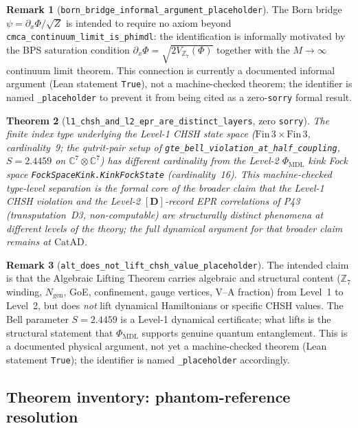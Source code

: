 \documentclass[11pt,a4paper]{article}
\newtheorem{theorem}{Theorem}[section]
\theoremstyle{definition}
\newtheorem{remark}[theorem]{Remark}
\newcommand{\CatAD}{\ensuremath{\mathrm{CatAD}}}
\newcommand{\ZS}{\mathbb{Z}_7}
\begin{document}
\begin{remark}[\lstinline|born_bridge_informal_argument_placeholder|]
The Born bridge $\psi=\partial_x\Phi/\sqrt{Z}$ is intended to require no axiom
beyond \lstinline|cmca_continuum_limit_is_phimdl|: the identification is
informally motivated by the BPS saturation condition
$\partial_x\Phi=\sqrt{2V_{\ZS}(\Phi)}$ together with the $M\to\infty$
continuum limit theorem.  This connection is currently a documented informal
argument (Lean statement \lstinline|True|), not a machine-checked theorem;
the identifier is named \lstinline|_placeholder| to prevent it from being
cited as a zero-\texttt{sorry} formal result.
\end{remark}

\begin{theorem}[\lstinline|l1_chsh_and_l2_epr_are_distinct_layers|, zero \texttt{sorry}]
The finite index type underlying the Level-1 CHSH state space
($\mathrm{Fin}\,3\times\mathrm{Fin}\,3$, cardinality~9; the qutrit-pair setup
of \lstinline|gte_bell_violation_at_half_coupling|, $S=2.4459$ on
$\mathbb{C}^7\otimes\mathbb{C}^7$) has different cardinality from the Level-2
$\Phi_{\mathrm{MDL}}$ kink Fock space
\lstinline|FockSpaceKink.KinkFockState| (cardinality~16).  This machine-checked
type-level separation is the formal core of the broader claim that the Level-1
CHSH violation and the Level-2 $[\mathbf{D}]$-record EPR correlations of P43
(transputation~D3, non-computable) are structurally distinct phenomena at
different levels of the theory; the full dynamical argument for that broader
claim remains at $\CatAD$.
\end{theorem}

\begin{remark}[\lstinline|alt_does_not_lift_chsh_value_placeholder|]
The intended claim is that the Algebraic Lifting Theorem carries algebraic
and structural content ($\mathbb{Z}_7$ winding, $N_{\mathrm{gen}}$, GoE,
confinement, gauge vertices, V--A fraction) from Level~1 to Level~2, but does
\emph{not} lift dynamical Hamiltonians or specific CHSH values.  The Bell
parameter $S=2.4459$ is a Level-1 dynamical certificate; what lifts is the
structural statement that $\Phi_{\mathrm{MDL}}$ supports genuine quantum
entanglement.  This is a documented physical argument, not yet a
machine-checked theorem (Lean statement \lstinline|True|); the identifier is
named \lstinline|_placeholder| accordingly.
\end{remark}

\subsection{Theorem inventory: phantom-reference resolution}\label{subsec:new-theorem-inventory-audit}
\end{document}
